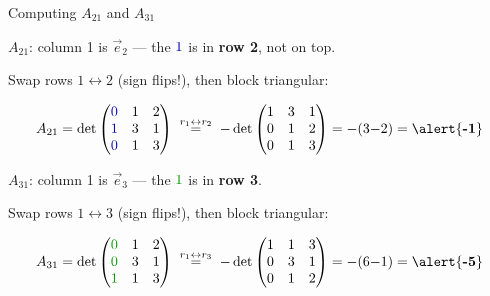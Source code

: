 \documentclass[10pt]{beamer}
\theoremstyle{definition}
\newcommand{\x}[1]{\alert{\textbf{#1}}}
\newcommand{\bl}[1]{{\color{blue!70!black}#1}}
\newcommand{\gn}[1]{{\color{green!60!black}#1}}
\begin{document}
\begin{frame}{Computing $A_{21}$ and $A_{31}$}

\textbf{$A_{21}$}: column 1 is $\vec{e}_2$ --- the $\bl{1}$ is in \x{row 2}, not on top.

\quad Swap rows $1 \leftrightarrow 2$ (sign flips!), then block triangular:

$$
A_{21} = \det\begin{pmatrix} \bl{0} & 1 & 2 \\ \bl{1} & 3 & 1 \\ \bl{0} & 1 & 3 \end{pmatrix}
\;\stackrel{r_1 \leftrightarrow r_2}{=}\;
{-}\det\begin{pmatrix} 1 & 3 & 1 \\ 0 & 1 & 2 \\ 0 & 1 & 3 \end{pmatrix}
= {-}(3{-}2) = \x{-1}
$$

\vfill

\textbf{$A_{31}$}: column 1 is $\vec{e}_3$ --- the $\gn{1}$ is in \x{row 3}.

\quad Swap rows $1 \leftrightarrow 3$ (sign flips!), then block triangular:

$$
A_{31} = \det\begin{pmatrix} \gn{0} & 1 & 2 \\ \gn{0} & 3 & 1 \\ \gn{1} & 1 & 3 \end{pmatrix}
\;\stackrel{r_1 \leftrightarrow r_3}{=}\;
{-}\det\begin{pmatrix} 1 & 1 & 3 \\ 0 & 3 & 1 \\ 0 & 1 & 2 \end{pmatrix}
= {-}(6{-}1) = \x{-5}
$$

\end{frame}
\end{document}

